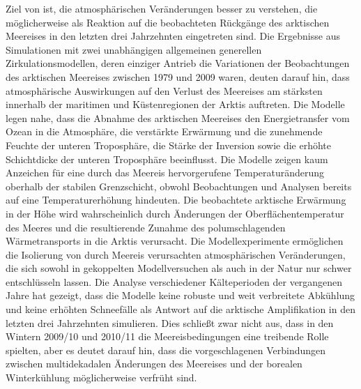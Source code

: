 Ziel von \citet{screen-2013} ist, die atmosphärischen Veränderungen besser zu verstehen, die möglicherweise als Reaktion auf die beobachteten Rückgänge des arktischen Meereises in den letzten drei Jahrzehnten eingetreten sind. Die Ergebnisse aus Simulationen mit zwei unabhängigen allgemeinen generellen Zirkulationsmodellen, deren einziger Antrieb die Variationen der Beobachtungen des arktischen Meereises zwischen 1979 und 2009 waren, deuten darauf hin, dass atmosphärische Auswirkungen auf den Verlust des Meereises am stärksten innerhalb der maritimen und Küstenregionen der Arktis auftreten. Die Modelle legen nahe, dass die Abnahme des arktischen Meereises den Energietransfer vom Ozean in die Atmosphäre, die verstärkte Erwärmung und die zunehmende Feuchte der unteren Troposphäre, die Stärke der Inversion sowie die erhöhte Schichtdicke der unteren Troposphäre beeinflusst. Die Modelle zeigen kaum Anzeichen für eine durch das Meereis hervorgerufene Temperaturänderung oberhalb der stabilen Grenzschicht, obwohl Beobachtungen und Analysen bereits auf eine Temperaturerhöhung hindeuten. Die beobachtete arktische Erwärmung in der Höhe wird wahrscheinlich durch Änderungen der Oberflächentemperatur des Meeres und die resultierende Zunahme des polumschlagenden Wärmetransports in die Arktis verursacht. Die Modellexperimente ermöglichen die Isolierung von durch Meereis verursachten atmosphärischen Veränderungen, die sich sowohl in gekoppelten Modellversuchen als auch in der Natur nur schwer entschlüsseln lassen. Die Analyse verschiedener Kälteperioden der vergangenen Jahre hat gezeigt, dass die Modelle keine robuste und weit verbreitete Abkühlung und keine erhöhten Schneefälle als Antwort auf die arktische Amplifikation in den letzten drei Jahrzehnten simulieren. Dies schließt zwar nicht aus, dass in den Wintern 2009/10 und 2010/11 die Meereisbedingungen eine treibende Rolle spielten, aber es deutet darauf hin, dass die vorgeschlagenen Verbindungen zwischen multidekadalen Änderungen des Meereises und der borealen Winterkühlung möglicherweise verfrüht sind.

